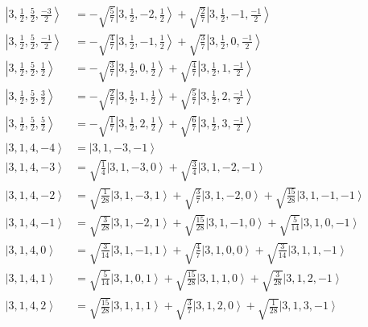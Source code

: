 \documentclass{report}
\newcommand{\ket}[1]{\left| #1 \right>} %
\begin{document}
\begin{align*}
\ket{ 3 ,  \frac{1}{2} ,  \frac{5}{2} ,  \frac{-3}{2}  } &=  - \sqrt{  \frac{5}{7}  } \ket{ 3 ,  \frac{1}{2} ,  -2 ,  \frac{1}{2}  } + \sqrt{  \frac{2}{7}  } \ket{ 3 ,  \frac{1}{2} ,  -1 ,  \frac{-1}{2}  } \\
\ket{ 3 ,  \frac{1}{2} ,  \frac{5}{2} ,  \frac{-1}{2}  } &=  - \sqrt{  \frac{4}{7}  } \ket{ 3 ,  \frac{1}{2} ,  -1 ,  \frac{1}{2}  } + \sqrt{  \frac{3}{7}  } \ket{ 3 ,  \frac{1}{2} ,  0 ,  \frac{-1}{2}  } \\
\ket{ 3 ,  \frac{1}{2} ,  \frac{5}{2} ,  \frac{1}{2}  } &=  - \sqrt{  \frac{3}{7}  } \ket{ 3 ,  \frac{1}{2} ,  0 ,  \frac{1}{2}  } + \sqrt{  \frac{4}{7}  } \ket{ 3 ,  \frac{1}{2} ,  1 ,  \frac{-1}{2}  } \\
\ket{ 3 ,  \frac{1}{2} ,  \frac{5}{2} ,  \frac{3}{2}  } &=  - \sqrt{  \frac{2}{7}  } \ket{ 3 ,  \frac{1}{2} ,  1 ,  \frac{1}{2}  } + \sqrt{  \frac{5}{7}  } \ket{ 3 ,  \frac{1}{2} ,  2 ,  \frac{-1}{2}  } \\
\ket{ 3 ,  \frac{1}{2} ,  \frac{5}{2} ,  \frac{5}{2}  } &=  - \sqrt{  \frac{1}{7}  } \ket{ 3 ,  \frac{1}{2} ,  2 ,  \frac{1}{2}  } + \sqrt{  \frac{6}{7}  } \ket{ 3 ,  \frac{1}{2} ,  3 ,  \frac{-1}{2}  } \\
\ket{ 3 ,  1 ,  4 ,  -4  } &=  \ket{ 3 ,  1 ,  -3 ,  -1  } \\
\ket{ 3 ,  1 ,  4 ,  -3  } &=  \sqrt{  \frac{1}{4}  } \ket{ 3 ,  1 ,  -3 ,  0  } + \sqrt{  \frac{3}{4}  } \ket{ 3 ,  1 ,  -2 ,  -1  } \\
\ket{ 3 ,  1 ,  4 ,  -2  } &=  \sqrt{  \frac{1}{28}  } \ket{ 3 ,  1 ,  -3 ,  1  } + \sqrt{  \frac{3}{7}  } \ket{ 3 ,  1 ,  -2 ,  0  } + \sqrt{  \frac{15}{28}  } \ket{ 3 ,  1 ,  -1 ,  -1  } \\
\ket{ 3 ,  1 ,  4 ,  -1  } &=  \sqrt{  \frac{3}{28}  } \ket{ 3 ,  1 ,  -2 ,  1  } + \sqrt{  \frac{15}{28}  } \ket{ 3 ,  1 ,  -1 ,  0  } + \sqrt{  \frac{5}{14}  } \ket{ 3 ,  1 ,  0 ,  -1  } \\
\ket{ 3 ,  1 ,  4 ,  0  } &=  \sqrt{  \frac{3}{14}  } \ket{ 3 ,  1 ,  -1 ,  1  } + \sqrt{  \frac{4}{7}  } \ket{ 3 ,  1 ,  0 ,  0  } + \sqrt{  \frac{3}{14}  } \ket{ 3 ,  1 ,  1 ,  -1  } \\
\ket{ 3 ,  1 ,  4 ,  1  } &=  \sqrt{  \frac{5}{14}  } \ket{ 3 ,  1 ,  0 ,  1  } + \sqrt{  \frac{15}{28}  } \ket{ 3 ,  1 ,  1 ,  0  } + \sqrt{  \frac{3}{28}  } \ket{ 3 ,  1 ,  2 ,  -1  } \\
\ket{ 3 ,  1 ,  4 ,  2  } &=  \sqrt{  \frac{15}{28}  } \ket{ 3 ,  1 ,  1 ,  1  } + \sqrt{  \frac{3}{7}  } \ket{ 3 ,  1 ,  2 ,  0  } + \sqrt{  \frac{1}{28}  } \ket{ 3 ,  1 ,  3 ,  -1  } \\

\end{align*}
\end{document}
